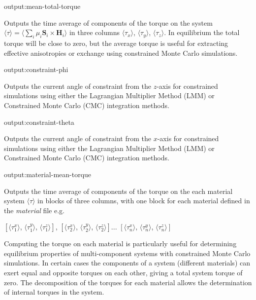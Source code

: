 {\zicf output:mean-total-torque} Outputs the time average of components of the torque on the system $\langle\tau\rangle = \langle\sum_i \mu_i \mathbf{S}_i \times \mathbf{H}_i \rangle$ in three columns $\langle\tau_x
\rangle$, $\langle\tau_y \rangle$, $\langle\tau_z \rangle$. In equilibrium the total torque will be close to zero, but the average torque is useful for extracting effective anisotropies or exchange using constrained Monte Carlo simulations.

{\zicf output:constraint-phi} Outputs the current angle of constraint from the $z$-axis for constrained simulations using either the Lagrangian Multiplier Method (LMM) or Constrained Monte Carlo (CMC) integration methods.

{\zicf output:constraint-theta} Outputs the current angle of constraint from the $x$-axis for constrained simulations using either the Lagrangian Multiplier Method (LMM) or Constrained Monte Carlo (CMC) integration methods.



{\zicf output:material-mean-torque} Outputs the time average of components of the torque on the each material system $\langle\tau\rangle$ in blocks of three columns, with one block for each material defined in the \textit{material} file e.g.

\begin{center}
$\left[ \langle\tau_1^x \rangle \right.$, $\langle\tau_1^y \rangle$, $\left. \langle\tau_1^z \rangle \right]$,
$\left[ \langle\tau_2^x \rangle \right.$, $\langle\tau_2^y \rangle$, $\left. \langle\tau_2^z \rangle \right]$...
$\left[ \langle\tau_n^x \rangle \right.$, $\langle\tau_n^y \rangle$, $\left. \langle\tau_n^z \rangle \right]$
\end{center}

Computing the torque on each material is particularly useful for determining equilibrium properties of multi-component systems with constrained Monte Carlo simulations. In certain cases the components of a system (different materials) can exert equal and opposite torques on each other, giving a total system torque of zero. The decomposition of the torques for each material allows the determination of internal torques in the system.


